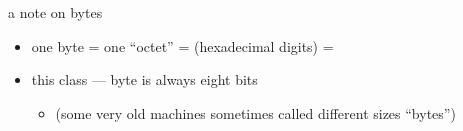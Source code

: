 \begin{frame}{a note on bytes}
    \begin{itemize}
        \item one byte = one ``octet'' =  (hexadecimal digits) = 
        \vspace{.5cm}
        \item this class --- byte is always eight bits
            \begin{itemize}
                \item (some very old machines sometimes called different sizes ``bytes'')
            \end{itemize}
    \end{itemize}
\end{frame}
